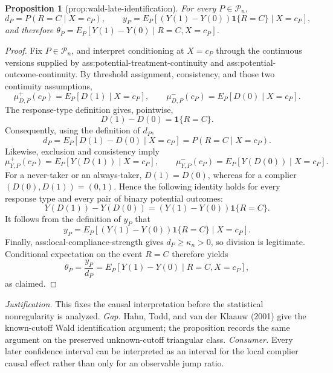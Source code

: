 \documentclass{article}
\newtheorem{proposition}{Proposition}
\begin{document}
\begin{proposition}[prop:wald-late-identification]\label{prop:wald-late-identification}
For every \(P\in\mathcal P_n\), \[d_P=P(R=C\mid X=c_P),\qquad y_P=E_P[(Y(1)-Y(0))\mathbf 1\{R=C\}\mid X=c_P],\] and therefore \(\theta_P=E_P[Y(1)-Y(0)\mid R=C,X=c_P]\).
\end{proposition}
\begin{proof}
Fix \(P\in\mathcal P_n\), and interpret conditioning at \(X=c_P\) through the continuous versions supplied by ass:potential-treatment-continuity and ass:potential-outcome-continuity.  By threshold assignment, consistency, and those two continuity assumptions,
\[
 \mu_{D,P}^{+}(c_P)=E_P[D(1)\mid X=c_P],\qquad
 \mu_{D,P}^{-}(c_P)=E_P[D(0)\mid X=c_P].
\]
The response-type definition gives, pointwise,
\[
 D(1)-D(0)=\mathbf 1\{R=C\}.
\]
Consequently, using the definition of \(d_P\),
\[
 d_P=E_P[D(1)-D(0)\mid X=c_P]
     =P(R=C\mid X=c_P).
\]
Likewise, exclusion and consistency imply
\[
 \mu_{Y,P}^{+}(c_P)=E_P[Y(D(1))\mid X=c_P],\qquad
 \mu_{Y,P}^{-}(c_P)=E_P[Y(D(0))\mid X=c_P].
\]
For a never-taker or an always-taker, \(D(1)=D(0)\), whereas for a complier \((D(0),D(1))=(0,1)\).  Hence the following identity holds for every response type and every pair of binary potential outcomes:
\[
 Y(D(1))-Y(D(0))
   =(Y(1)-Y(0))\mathbf 1\{R=C\}.
\]
It follows from the definition of \(y_P\) that
\[
 y_P=E_P[(Y(1)-Y(0))\mathbf 1\{R=C\}\mid X=c_P].
\]
Finally, ass:local-compliance-strength gives \(d_P\ge\kappa_n>0\), so division is legitimate.  Conditional expectation on the event \(R=C\) therefore yields
\[
 \theta_P=\frac{y_P}{d_P}
 =E_P[Y(1)-Y(0)\mid R=C,X=c_P],
\]
as claimed.
\end{proof}
\par\smallskip\noindent \textit{Justification.} This fixes the causal interpretation before the statistical nonregularity is analyzed. \textit{Gap.} Hahn, Todd, and van der Klaauw (2001) give the known-cutoff Wald identification argument; the proposition records the same argument on the preserved unknown-cutoff triangular class. \textit{Consumer.} Every later confidence interval can be interpreted as an interval for the local complier causal effect rather than only for an observable jump ratio.
\end{document}
